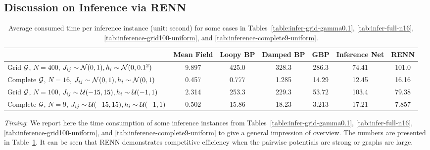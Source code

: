 \subsection{Discussion on Inference via RENN}
\begin{table}[!tp]
  \caption{Average consumed time per inference instance (unit: second) for some cases in Tables~\ref{table:infer-grid-gamma0.1}, \ref{tab:infer-full-n16}, \ref{tab:inference-grid100-uniform}, and \ref{tab:inference-complete9-uniform}.}
  \label{tab:time-inference}
  \centering
  \begin{adjustbox}{width=1\textwidth}
    \begin{tabular}{lcccccc}
      \toprule
      {} &  Mean Field & Loopy BP & Damped BP & GBP & Inference Net & RENN \\
      \toprule
      Grid $\mathcal{G}$, $N=400$, $J_{ij}\sim \mathcal{N}(0,1), h_i\sim\mathcal{N}(0,0.1^2)$ & 9.897 & 425.0 & 328.3 & 286.3 & 74.41 & 101.0 \\
      Complete $\mathcal{G}$, $N=16$, $J_{ij}\sim \mathcal{N}(0,1), h_i\sim\mathcal{N}(0,1)$ & 0.457 & 0.777 & 1.285 & 14.29 &  12.45  & 16.16\\
      Grid $\mathcal{G}$, $N=100$, $J_{ij}\sim \mathcal{U}(-15,15), h_i\sim\mathcal{U}(-1,1)$ & 2.314 & 253.3 & 229.3 & 53.72 & 103.4 & 79.38 \\
      Complete $\mathcal{G}$, $N=9$, $J_{ij}\sim \mathcal{U}(-15,15), h_i\sim\mathcal{U}(-1,1)$ & 0.502 & 15.86 & 18.23 & 3.213 & 17.21 & 7.857 \\
      \bottomrule
    \end{tabular}
  \end{adjustbox}
\end{table}


\textit{Timing}: We report here the time consumption of some inference instances from Tables~\ref{table:infer-grid-gamma0.1}, \ref{tab:infer-full-n16}, \ref{tab:inference-grid100-uniform}, and \ref{tab:inference-complete9-uniform} to give a general impression of overview. The numbers are presented in Table~\ref{tab:time-inference}. It can be seen that RENN demonstrates competitive efficiency when the pairwise potentials are strong or graphs are large.

